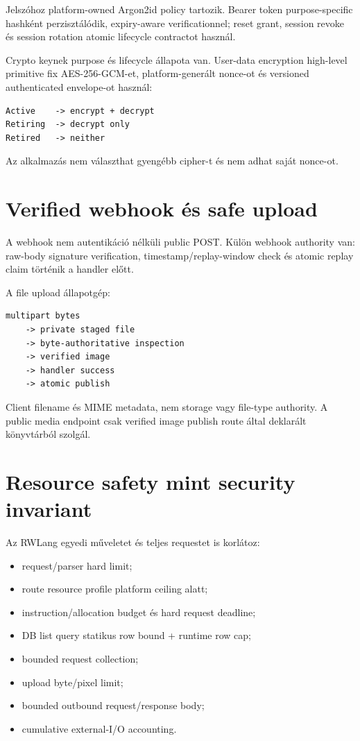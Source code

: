 Jelszóhoz platform-owned Argon2id policy tartozik. Bearer token purpose-specific hashként perzisztálódik, expiry-aware verificationnel; reset grant, session revoke és session rotation atomic lifecycle contractot használ.

Crypto keynek purpose és lifecycle állapota van. User-data encryption high-level primitive fix AES-256-GCM-et, platform-generált nonce-ot és versioned authenticated envelope-ot használ:

\begin{lstlisting}
Active    -> encrypt + decrypt
Retiring  -> decrypt only
Retired   -> neither
\end{lstlisting}

Az alkalmazás nem választhat gyengébb cipher-t és nem adhat saját nonce-ot.

\section{Verified webhook és safe upload}

A webhook nem autentikáció nélküli public POST. Külön webhook authority van: raw-body signature verification, timestamp/replay-window check és atomic replay claim történik a handler előtt.

A file upload állapotgép:

\begin{lstlisting}
multipart bytes
    -> private staged file
    -> byte-authoritative inspection
    -> verified image
    -> handler success
    -> atomic publish
\end{lstlisting}

Client filename és MIME metadata, nem storage vagy file-type authority. A public media endpoint csak verified image publish route által deklarált könyvtárból szolgál.

\section{Resource safety mint security invariant}

Az RWLang egyedi műveletet és teljes requestet is korlátoz:

\begin{itemize}
  \item request/parser hard limit;
  \item route resource profile platform ceiling alatt;
  \item instruction/allocation budget és hard request deadline;
  \item DB list query statikus row bound + runtime row cap;
  \item bounded request collection;
  \item upload byte/pixel limit;
  \item bounded outbound request/response body;
  \item cumulative external-I/O accounting.
\end{itemize}


